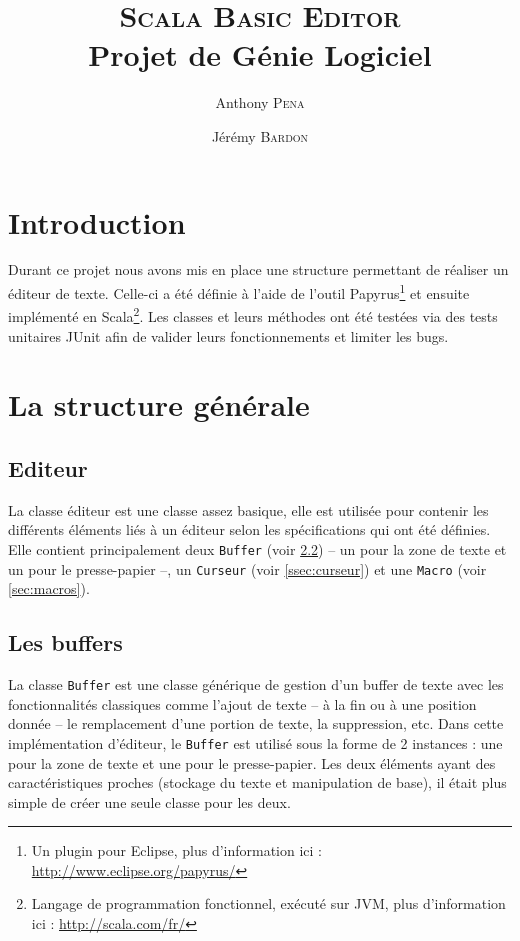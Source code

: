 \documentclass[french]{article}
\author{Anthony \textsc{Pena} \and Jérémy \textsc{Bardon}}
\title{\textsc{Scala Basic Editor}\\\normalsize{Projet de Génie Logiciel}}
\date{}
\begin{document}
\maketitle

\vspace{3cm}

\renewcommand\contentsname{Sommaire}
\tableofcontents

\newpage

\section{Introduction}

Durant ce projet nous avons mis en place une structure permettant de réaliser un éditeur de texte. Celle-ci a été définie à l'aide de l'outil Papyrus\footnote{Un plugin pour Eclipse, plus d'information ici : \url{http://www.eclipse.org/papyrus/}} et ensuite implémenté en Scala\footnote{Langage de programmation fonctionnel, exécuté sur JVM, plus d'information ici : \url{http://scala.com/fr/}}. Les classes et leurs méthodes ont été testées via des tests unitaires JUnit afin de valider leurs fonctionnements et limiter les bugs.

\section{La structure générale}

\subsection{Editeur}\label{ssec:éditeur}
La classe éditeur est une classe assez basique, elle est utilisée pour contenir les différents éléments liés à un éditeur selon les spécifications qui ont été définies. Elle contient principalement deux \texttt{Buffer} (voir \ref{ssec:buffers}) -- un pour la zone de texte et un pour le presse-papier --, un \texttt{Curseur} (voir \ref{ssec:curseur}) et une \texttt{Macro} (voir \ref{sec:macros}).

\subsection{Les buffers}\label{ssec:buffers}
La classe \texttt{Buffer} est une classe générique de gestion d'un buffer de texte avec les fonctionnalités classiques comme l'ajout de texte -- à la fin ou à une position donnée -- le remplacement d'une portion de texte, la suppression, etc. Dans cette implémentation d'éditeur, le \texttt{Buffer} est utilisé sous la forme de 2 instances : une pour la \og{}zone de texte\fg{} et une pour le \og{}presse-papier\fg{}. Les deux éléments ayant des caractéristiques proches (stockage du texte et manipulation de base), il était plus simple de créer une seule classe pour les deux.
\end{document}

